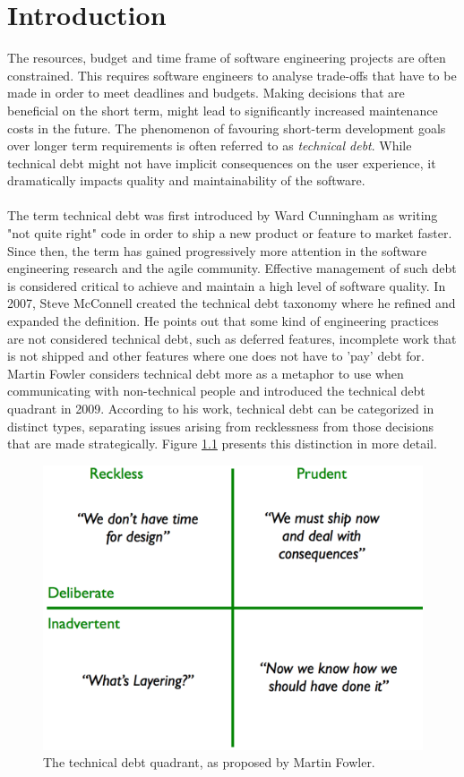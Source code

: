 \chapter{Introduction}


The resources, budget and time frame of software engineering projects are often constrained.
This requires software engineers to analyse trade-offs that have to be made in order to meet deadlines and budgets.
Making decisions that are beneficial on the short term, might lead to significantly increased maintenance costs in the future.
The phenomenon of favouring short-term development goals over longer term requirements is often referred to as \emph{technical debt}.
While technical debt might not have implicit consequences on the user experience, it dramatically impacts quality and maintainability of the software.\\\\
The term technical debt was first introduced by Ward Cunningham as writing "not quite right" code in order to ship a new product or feature to market faster.
Since then, the term has gained progressively more attention in the software engineering research and the agile community.
Effective management of such debt is considered critical to achieve and maintain a high level of software quality.
In 2007, Steve McConnell created the technical debt taxonomy where he refined and expanded the definition.
He points out that some kind of engineering practices are not considered technical debt, such as deferred features, incomplete work that is not shipped and other features where one does not have to 'pay' debt for.
Martin Fowler considers technical debt more as a metaphor to use when communicating with non-technical people and introduced the technical debt quadrant in 2009.
According to his work, technical debt can be categorized in distinct types, separating issues arising from recklessness from those decisions that are made strategically. 
Figure \ref{fig:technical-debt-quadrant} presents this distinction in more detail.\\

\begin{figure}[!h]
	\centering
	\includegraphics[width=0.5\columnwidth]{images/technical_debt_quadrant}
	\caption{The technical debt quadrant, as proposed by Martin Fowler.}
	\label{fig:technical-debt-quadrant}
\end{figure}


